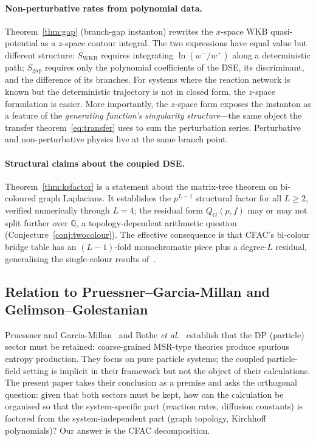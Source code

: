 \documentclass[11pt,a4paper]{article}
\theoremstyle{plain}
\begin{document}
\paragraph{Non-perturbative rates from polynomial data.}
Theorem~\ref{thm:gap} (branch-gap instanton) rewrites the
$x$-space WKB quasi-potential as a $z$-space contour integral.
The two expressions have equal value but different structure:
$S_{\mathrm{WKB}}$ requires integrating $\ln(w^-/w^+)$ along a
deterministic path; $S_{\mathrm{gap}}$ requires only the
polynomial coefficients of the DSE, its discriminant, and the
difference of its branches.  For systems where the reaction
network is known but the deterministic trajectory is not in closed
form, the $z$-space formulation is easier.  More importantly, the
$z$-space form exposes the instanton as a feature of the
\emph{generating function's singularity structure}---the same
object the transfer theorem~\eqref{eq:transfer} uses to sum the
perturbation series.  Perturbative and non-perturbative physics
live at the same branch point.

\paragraph{Structural claims about the coupled DSE.}
Theorem~\ref{thm:ksfactor} is a statement about the matrix-tree
theorem on bi-coloured graph Laplacians.  It establishes the
$p^{L-1}$ structural factor for all $L \geq 2$, verified
numerically through $L = 4$; the residual form $Q_G(p,f)$ may or
may not split further over $\mathbb{Q}$, a topology-dependent
arithmetic question (Conjecture~\ref{conj:twocolour}).  The
effective consequence is that CFAC's bi-colour bridge table has
an $(L-1)$-fold monochromatic piece plus a degree-$L$ residual,
generalising the single-colour results
of~\cite{Amarteifio2019Thesis,BognerWeinzierl}.

\subsection{Relation to Pruessner--Garcia-Millan and Gelimson--Golestanian}

Pruessner and Garcia-Millan~\cite{PruessnerGarciaMillan2025} and
Bothe \textit{et al.}~\cite{Bothe2023} establish that the DP
(particle) sector must be retained: coarse-grained MSR-type
theories produce spurious entropy production.  They focus on
pure particle systems; the coupled particle-field setting is
implicit in their framework but not the object of their
calculations.  The present paper takes their conclusion as a
premise and asks the orthogonal question: given that both sectors
must be kept, how can the calculation be organised so that the
system-specific part (reaction rates, diffusion constants) is
factored from the system-independent part (graph topology,
Kirchhoff polynomials)?  Our answer is the CFAC decomposition.
\end{document}
